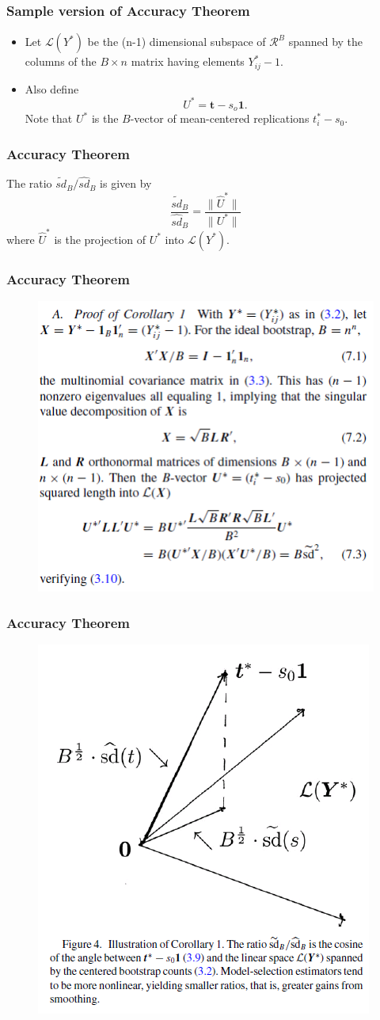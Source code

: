 \documentclass{beamer}
\begin{document}
\begin{frame}
\frametitle{Sample version of Accuracy Theorem}
\begin{itemize}
\item Let $\mathcal{L}(Y^*)$ be the (n-1) dimensional subspace of $\mathcal{R}^B$ spanned by the columns of the $B \times n$ matrix having elements $Y_{ij} ^* -1 $.
\item Also define $$ U^* = \mathbf{t} - s_o \mathbf{1}.$$
Note that $U^*$ is the $B$-vector of mean-centered replications $t_i^* - s_0$.
\end{itemize}
\end{frame}
\begin{frame}
\frametitle{Accuracy Theorem}
\begin{corollary}
The ratio $\tilde{sd}_B / \hat{sd}_B$ is given by
$$ \frac{\tilde{sd}_B}{\hat{sd}_B} = \frac{\| \hat{U}^* \|}{\| U^* \|}$$
where $\hat{U}^* $ is the projection of $U^* $ into $\mathcal{L}(Y^*)$.
\end{corollary}
\end{frame}
\begin{frame}
\frametitle{Accuracy Theorem}
\begin{figure}[h]
\centering
\includegraphics[width=200bp, height= 190bp]{proof4_e.png}
\end{figure}
\end{frame}
\begin{frame}
\frametitle{Accuracy Theorem}
\begin{figure}[h]
\centering
\includegraphics[width=180bp, height= 220bp]{figure4_e.png}
\end{figure}
\end{frame}
\end{document}
